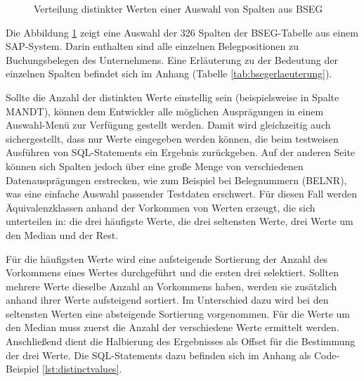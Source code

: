 
\begin{figure}
\centering
	\caption{Verteilung distinkter Werten einer Auswahl von Spalten aus BSEG}
	\label{fig:bseg}
\end{figure}

Die Abbildung \ref{fig:bseg} zeigt eine Auswahl der 326 Spalten der BSEG-Tabelle aus einem SAP-System.
Darin enthalten sind alle einzelnen Belegpositionen zu Buchungsbelegen des Unternehmens.
Eine Erläuterung zu der Bedeutung der einzelnen Spalten befindet sich im Anhang (Tabelle \ref{tab:bsegerlaeuterung}).

Sollte die Anzahl der distinkten Werte einstellig sein (beispielsweise in Spalte MANDT), können dem Entwickler alle möglichen Ausprägungen in einem Auswahl-Menü zur Verfügung gestellt werden.
Damit wird gleichzeitig auch sichergestellt, dass nur Werte eingegeben werden können, die beim testweisen Ausführen von SQL-Statements ein Ergebnis zurückgeben.
Auf der anderen Seite können sich Spalten jedoch über eine große Menge von verschiedenen Datenausprägungen erstrecken, wie zum Beispiel bei Belegnummern (BELNR), was eine einfache Auswahl passender Testdaten erschwert.
Für diesen Fall werden Äquivalenzklassen anhand der Vorkommen von Werten erzeugt, die sich unterteilen in: die drei häufigste Werte, die drei seltensten Werte, drei Werte um den Median und der Rest.

Für die häufigsten Werte wird eine aufsteigende Sortierung der Anzahl des Vorkommens eines Wertes durchgeführt und die ersten drei selektiert.
Sollten mehrere Werte dieselbe Anzahl an Vorkommens haben, werden sie zusätzlich anhand ihrer Werte aufsteigend sortiert.
Im Unterschied dazu wird bei den seltensten Werten eine absteigende Sortierung vorgenommen.
Für die Werte um den Median muss zuerst die Anzahl der verschiedene Werte ermittelt werden.
Anschließend dient die Halbierung des Ergebnisses als Offset für die Bestimmung der drei Werte.
Die SQL-Statements dazu befinden sich im Anhang als Code-Beispiel \ref{lst:distinctvalues}.


